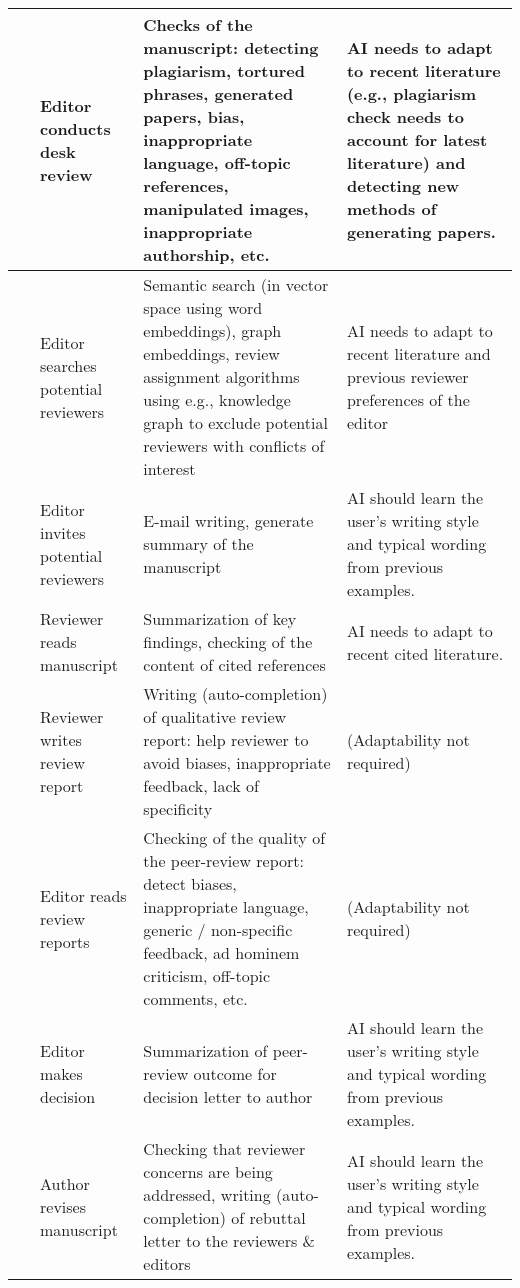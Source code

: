 \begin{landscape}
\begin{table}[h!]
\begin{tabularx}{\linewidth}{L{0.05} L{0.2} L{0.35} L{0.35}}
             & Editor conducts desk review & Checks of the manuscript: detecting plagiarism, tortured phrases,
                generated papers, bias, inappropriate language, off-topic references, manipulated images, inappropriate authorship, etc.
                & AI needs to adapt to recent literature (e.g., plagiarism check needs
                to account for latest literature) and detecting new methods of generating papers.\\ 
            \midrule

             & Editor searches potential reviewers & Semantic search (in vector space using word embeddings), graph embeddings,
                review assignment algorithms using e.g., knowledge graph to exclude potential reviewers with conflicts of interest & AI needs to
                adapt to recent literature and previous reviewer preferences of the editor \\ 
            \midrule

             & Editor invites potential reviewers & E-mail writing, generate summary of the manuscript &
                AI should learn the user's writing style and typical wording from previous examples. \\
            \midrule

             & Reviewer reads manuscript & Summarization of key findings, checking of the content of cited references &
                AI needs to adapt to recent cited literature. \\ 
            \midrule

             & Reviewer writes review report & Writing (auto-completion) of qualitative review report: help reviewer to avoid biases,
                inappropriate feedback, lack of specificity & (Adaptability not required) \\ 
            \midrule

             & Editor reads review reports & Checking of the quality of the peer-review report: detect biases, inappropriate 
                language, generic / non-specific feedback, ad hominem criticism, off-topic comments, etc.  & (Adaptability not required) \\ 
            \midrule

            ~ & Editor makes decision & Summarization of peer-review outcome for decision letter
                to author & AI should learn the user's writing style and typical wording from previous examples. \\ 
            \midrule

             & Author revises manuscript & Checking that reviewer concerns are being addressed, writing (auto-completion) of
                rebuttal letter to the reviewers \& editors & AI should learn the user's writing style and typical wording from previous examples. \\
            \bottomrule
        \end{tabularx}
    \end{table}
\end{landscape}
